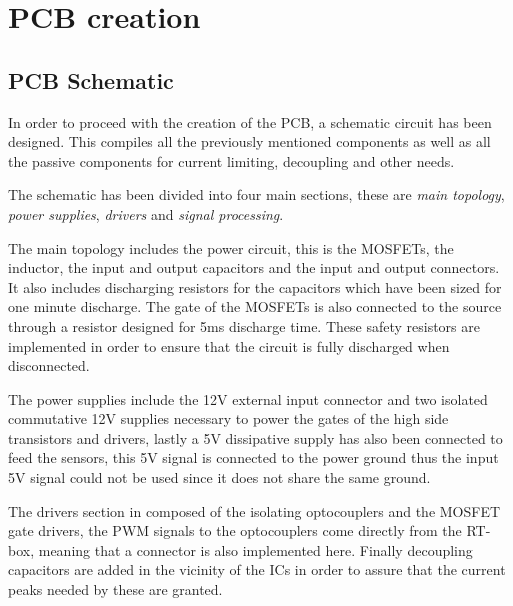 \section{PCB creation}
\subsection{PCB Schematic} \label{PCB_Schematic}
In order to proceed with the creation of the PCB, a schematic circuit has been designed. This compiles all the previously mentioned components as well as all the passive components for current limiting, decoupling and other needs. 

The schematic has been divided into four main sections, these are \textit{main topology}, \textit{power supplies}, \textit{drivers} and \textit{signal processing}.

The main topology includes the power circuit, this is the MOSFETs, the inductor, the input and output capacitors and the input and output connectors. It also includes discharging resistors for the capacitors which have been sized for one minute discharge. The gate of the MOSFETs is also connected to the source through a resistor designed for 5ms discharge time. These safety resistors are implemented in order to ensure that the circuit is fully discharged when disconnected. 

The power supplies include the 12V external input connector and two isolated commutative 12V supplies necessary to power the gates of the high side transistors and drivers, lastly a 5V dissipative supply has also been connected to feed the sensors, this 5V signal is connected to the power ground thus the input 5V signal could not be used since it does not share the same ground.

The drivers section in composed of the isolating optocouplers and the MOSFET gate drivers, the PWM signals to the optocouplers come directly from the RT-box, meaning that a connector is also implemented here. Finally decoupling capacitors are added in the vicinity of the ICs  in order to assure that the current peaks needed by these are granted. 

